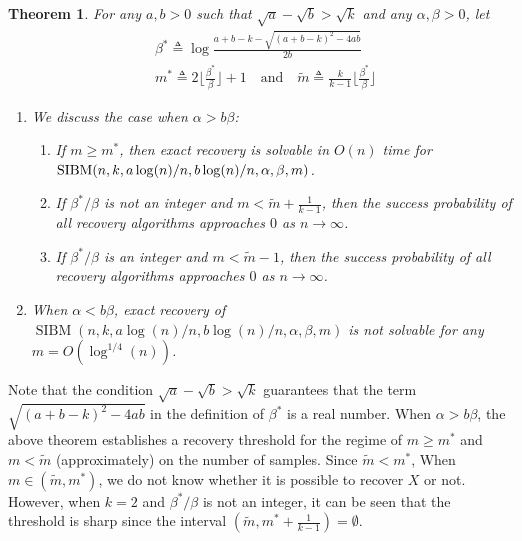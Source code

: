 \label{key}\documentclass[conference]{IEEEtran}
\newtheorem{theorem}{Theorem}%
\DeclareMathOperator{\SIBM}{SIBM}
\begin{document}
\begin{theorem} \label{thm:wt1}
For any $a,b> 0$ such that $\sqrt{a}-\sqrt{b}> \sqrt{k}$ and any $\alpha,\beta>0$, let
\begin{align} \label{eq:defstar}
&\beta^\ast \triangleq
\log\frac{a+b-k-\sqrt{(a+b-k)^2-4ab}}{2 b}  \\
&m^\ast \triangleq 2 \Big\lfloor \frac{\beta^\ast}{\beta} \Big\rfloor +1 \text{~~~and~~~}
\tilde{m} \triangleq \frac{k}{k-1}\Big\lfloor \frac{\beta^\ast}{\beta} \Big\rfloor
\end{align}
\begin{enumerate}
	\item We discuss the case when $\alpha > b \beta$:
	\begin{enumerate}
	\item If $m\ge m^\ast$, then exact recovery is solvable in $O(n)$ time for $\SIBM(n,k, a\log(n)/n, \linebreak[4] b\log(n)/n,\alpha,\beta,m)$.
	\item If $\beta^\ast/\beta$ is not an integer and $m < \tilde{m} + \frac{1}{k-1}$, then the success probability of all recovery algorithms approaches $0$ as $n\to\infty$.
	\item If $\beta^\ast/\beta$ is an integer and $m < \tilde{m} -1$, then the success probability of all recovery algorithms approaches $0$ as $n\to\infty$.
	\end{enumerate}
	\item When $\alpha < b \beta$, exact recovery of $\SIBM(n,k, a\log(n)/n, b\log(n)/n,\alpha,\beta,m)$ is not solvable for any $m=O(\log^{1/4}(n))$.
\end{enumerate}

\end{theorem}
Note that the condition $\sqrt{a}-\sqrt{b} > \sqrt{k}$ guarantees that the term $\sqrt{(a+b-k)^2-4ab}$ in the definition of $\beta^\ast$ is a real number.
When $\alpha > b \beta$,
the above theorem establishes a recovery threshold
for the regime of $m \geq m^\ast$ and $m < \tilde{m}$ (approximately) on the number of samples. Since $\tilde{m} < m^*$,
When $m \in (\tilde{m}, m^\ast)$, we do not know whether it is possible to recover $X$ or not.
However, when $k=2$ and $\beta^\ast/\beta$ is not an integer, it can be seen that the threshold is sharp since the interval $(\tilde{m}, m^\ast + \frac{1}{k-1})=\emptyset$.
\end{document}
